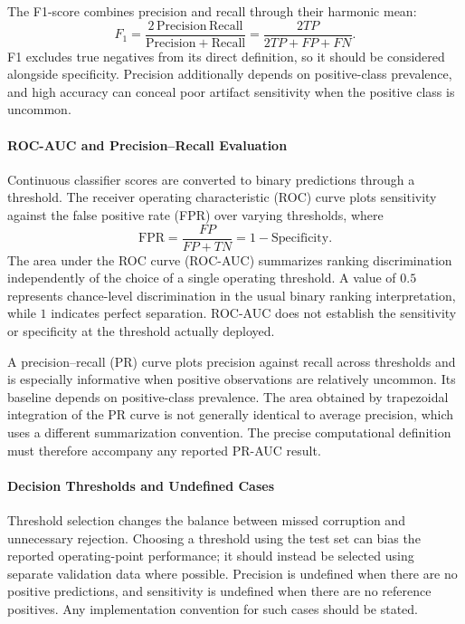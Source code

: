 The F1-score combines precision and recall through their harmonic mean:
\begin{equation}
F_1=\frac{2\,\mathrm{Precision}\,\mathrm{Recall}}
{\mathrm{Precision}+\mathrm{Recall}}
=\frac{2TP}{2TP+FP+FN}.
\end{equation}
F1 excludes true negatives from its direct definition, so it should be considered alongside specificity. Precision additionally depends on positive-class prevalence, and high accuracy can conceal poor artifact sensitivity when the positive class is uncommon.

\paragraph{ROC-AUC and Precision--Recall Evaluation}
Continuous classifier scores are converted to binary predictions through a threshold. The receiver operating characteristic (ROC) curve plots sensitivity against the false positive rate (FPR) over varying thresholds, where
\begin{equation}
\mathrm{FPR}=\frac{FP}{FP+TN}=1-\mathrm{Specificity}.
\end{equation}
The area under the ROC curve (ROC-AUC) summarizes ranking discrimination independently of the choice of a single operating threshold. A value of $0.5$ represents chance-level discrimination in the usual binary ranking interpretation, while $1$ indicates perfect separation. ROC-AUC does not establish the sensitivity or specificity at the threshold actually deployed.

A precision--recall (PR) curve plots precision against recall across thresholds and is especially informative when positive observations are relatively uncommon. Its baseline depends on positive-class prevalence. The area obtained by trapezoidal integration of the PR curve is not generally identical to average precision, which uses a different summarization convention. The precise computational definition must therefore accompany any reported PR-AUC result.

\paragraph{Decision Thresholds and Undefined Cases}
Threshold selection changes the balance between missed corruption and unnecessary rejection. Choosing a threshold using the test set can bias the reported operating-point performance; it should instead be selected using separate validation data where possible. Precision is undefined when there are no positive predictions, and sensitivity is undefined when there are no reference positives. Any implementation convention for such cases should be stated.

